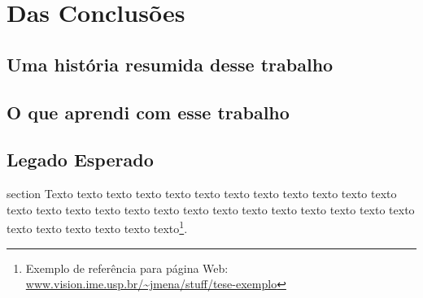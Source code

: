 \chapter{Das Conclusões}
\label{cap:conclusoes}

\section{Uma história resumida desse trabalho}
\label{sec:about-it}

\section{O que aprendi com esse trabalho}
\label{sec:lessions}

\section{Legado Esperado}
\label{sec:legacy}


section
Texto texto texto texto texto texto texto texto texto texto texto texto texto
texto texto texto texto texto texto texto texto texto texto texto texto texto
texto texto texto texto texto texto\footnote{Exemplo de referência para página
Web: \url{www.vision.ime.usp.br/~jmena/stuff/tese-exemplo}}.
